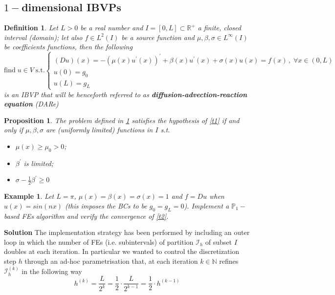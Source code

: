\documentclass[12pt,openany,twoside,a4paper]{article}
\newtheorem{defn}{Definition}
\newtheorem{prop}{Proposition}
\newtheorem{exmp}{Example}
\begin{document}
\subsection{$1-$dimensional IBVPs}
\begin{defn}\label{d2}
Let $L>0$ be a real number and $I=[0,L]\subset\mathbb{R}^+$ a finite, closed interval (domain); let also $f\in L^2(I)$ be a source function and $\mu,\beta,\sigma\in L^{\infty}(I)$ be coefficients functions, then the following
\begin{equation*}
    \text{find}\;u\in V\;\text{s.t.}
    \begin{cases}
    (Du)(x)=-(\mu(x)u^{'}(x))^{'}+\beta(x)u^{'}(x)+\sigma(x)u(x)=f(x)\,,\;\forall x\in(0,L) \\
    u(0) = g_0 \\
    u(L) = g_L
    \end{cases}
\end{equation*}
is an IBVP that will be henceforth referred to as \textbf{diffusion-advection-reaction equation} (DARe)
\end{defn}
\begin{prop}\label{p1}
The problem defined in \ref{d2} satisfies the hypothesis of \ref{t1} if and only if $\mu,\beta,\sigma$ are (uniformly limited) functions in $I$ s.t.
\begin{itemize}
    \item $\mu(x)\geq\mu_0>0$;
    \item $\beta^{'}$ is limited;
    \item $\sigma-\frac{1}{2}\beta^{'}\geq0$
\end{itemize}
\end{prop}
\begin{exmp}\label{ex1}
Let $L=\pi$, $\mu(x)=\beta(x)=\sigma(x)=1$ and $f=Du$ when $u(x)=sin(nx)$ (this imposes the BCs to be $g_0=g_L=0$). Implement a $\mathbb{P}_1-$based FEs algorithm and verify the convergence of \ref{t2}.
\end{exmp}
\textbf{Solution}
\newline The implementation strategy has been performed by including an outer loop in which the number of FEs (i.e. subintervals) of partition $\mathcal{I}_h$ of subset $I$ doubles at each iteration. In particular we wanted to control the discretization step $h$ through an ad-hoc parametrisation that, at each iteration $k\in\mathbb{N}$ refines $\mathcal{I}_h^{(k)}$ in the following way 
\begin{equation*}
    h^{(k)}=\frac{L}{2^k}=\frac{1}{2}\cdot\frac{L}{2^{k-1}}=\frac{1}{2}\cdot h^{(k-1)}
\end{equation*}
\end{document}
